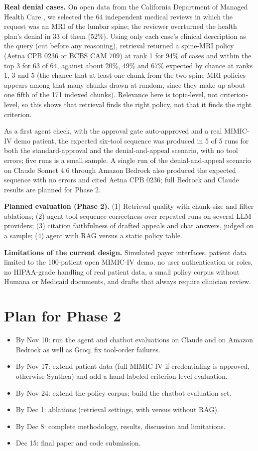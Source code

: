 \documentclass[final]{cvpr}
\begin{document}
\textbf{Real denial cases.} On open data from the California Department of Managed Health Care \cite{dmhc_imr}, we selected the 64 independent medical reviews in which the request was an MRI of the lumbar spine; the reviewer overturned the health plan's denial in 33 of them (52\%). Using only each case's clinical description as the query (cut before any reasoning), retrieval returned a spine-MRI policy (Aetna CPB 0236 or BCBS CAM 709) at rank 1 for 94\% of cases and within the top 3 for 63 of 64, against about 20\%, 49\% and 67\% expected by chance at ranks 1, 3 and 5 (the chance that at least one chunk from the two spine-MRI policies appears among that many chunks drawn at random, since they make up about one fifth of the 171 indexed chunks). Relevance here is topic-level, not criterion-level, so this shows that retrieval finds the right policy, not that it finds the right criterion.

As a first agent check, with the approval gate auto-approved and a real MIMIC-IV demo patient, the expected six-tool sequence was produced in 5 of 5 runs for both the standard-approval and the denial-and-appeal scenario, with no tool errors; five runs is a small sample. A single run of the denial-and-appeal scenario on Claude Sonnet 4.6 through Amazon Bedrock also produced the expected sequence with no errors and cited Aetna CPB 0236; full Bedrock and Claude results are planned for Phase 2.

\textbf{Planned evaluation (Phase 2).} (1) Retrieval quality with chunk-size and filter ablations; (2) agent tool-sequence correctness over repeated runs on several LLM providers; (3) citation faithfulness of drafted appeals and chat answers, judged on a sample; (4) agent with RAG versus a static policy table.

\textbf{Limitations of the current design.} Simulated payer interfaces, patient data limited to the 100-patient open MIMIC-IV demo, no user authentication or roles, no HIPAA-grade handling of real patient data, a small policy corpus without Humana or Medicaid documents, and drafts that always require clinician review.

\section{Plan for Phase 2}
\begin{itemize}
    \item By Nov 10: run the agent and chatbot evaluations on Claude and on Amazon Bedrock as well as Groq; fix tool-order failures.
    \item By Nov 17: extend patient data (full MIMIC-IV if credentialing is approved, otherwise Synthea) and add a hand-labeled criterion-level evaluation.
    \item By Nov 24: extend the policy corpus; build the chatbot evaluation set.
    \item By Dec 1: ablations (retrieval settings, with versus without RAG).
    \item By Dec 8: complete methodology, results, discussion and limitations.
    \item Dec 15: final paper and code submission.
\end{itemize}


{\small


}
\end{document}
